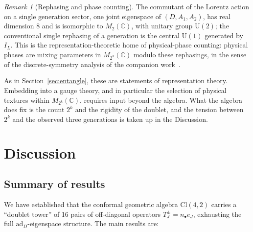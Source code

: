 \documentclass{birkjour}
\theoremstyle{definition}
\theoremstyle{remark}
\newtheorem{rem}[thm]{Remark}
\numberwithin{equation}{section}
\newcommand{\Cl}{\mathrm{Cl}}
\newcommand{\C}{\mathbb{C}}
\newcommand{\ad}{\mathrm{ad}}
\newenvironment{revblock}{}{}
\begin{document}
\begin{revblock}
\begin{rem}[Rephasing and phase counting]\label{rem:rephasing}
The commutant of the Lorentz action on a single generation
sector, one joint eigenspace of $(D,A_1,A_2)$, has real
dimension $8$ and is isomorphic to $M_2(\C)$, with unitary
group $\mathrm{U}(2)$; the conventional single rephasing of
a generation is the central $\mathrm{U}(1)$ generated by
$I_L$. This is the representation-theoretic home of
physical-phase counting: physical phases are mixing
parameters in $M_{2^k}(\C)$ modulo these rephasings, in the
sense of the discrete-symmetry analysis of the companion
work~\cite{HansenCPT2026}.
\end{rem}

As in Section~\ref{sec:entangle}, these are statements of
representation theory. Embedding into a gauge theory, and
in particular the selection of physical textures within
$M_{2^k}(\C)$, requires input beyond the algebra. What the
algebra does fix is the count $2^k$ and the rigidity of the
doublet, and the tension between $2^k$ and the observed three
generations is taken up in the Discussion.
\end{revblock}


\section{Discussion}\label{sec:discussion}

\subsection{Summary of results}

We have established that the conformal geometric algebra
$\Cl(4,2)$ carries a ``doublet tower'' of 16 pairs of
off-diagonal operators $T^\pm_J=n_\bullet e_J$,
exhausting the full $\ad_D$-eigenspace structure.
The main results are:
\end{document}
